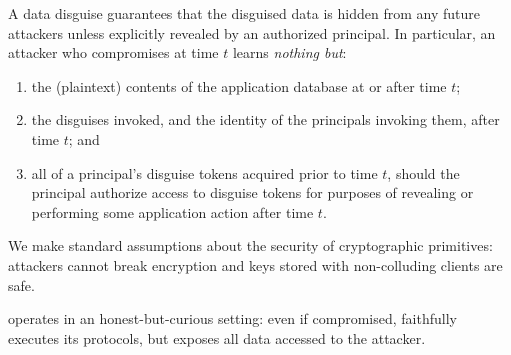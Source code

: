 %
A data disguise guarantees that the disguised data is hidden from any future attackers unless
explicitly revealed by an authorized principal.
%
In particular, an attacker who compromises \sys at time $t$ learns \emph{nothing but}:
\begin{enumerate}[nosep]
  \item the (plaintext) contents of the application database at or after time $t$;
  \item the disguises invoked, and the identity of the principals invoking them, after time $t$; and
  \item all of a principal's disguise tokens acquired prior to time $t$, should the principal authorize access to
      disguise tokens for purposes of revealing or performing some application action after time $t$.
\end{enumerate}
%
We make standard assumptions about the security of cryptographic primitives: attackers cannot
break encryption and keys stored with non-colluding clients are safe.
%

%
\sys operates in an honest-but-curious setting: even if compromised, \sys faithfully executes
its protocols, but exposes all data accessed to the attacker.
%

%
%
%
%

